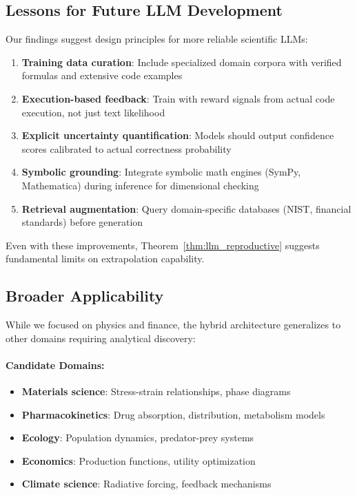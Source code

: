 \documentclass[twoside,11pt]{article}
\begin{document}
\subsection{Lessons for Future LLM Development}

Our findings suggest design principles for more reliable scientific LLMs:

\begin{enumerate}
\item \textbf{Training data curation}: Include specialized domain corpora with verified formulas and extensive code examples

\item \textbf{Execution-based feedback}: Train with reward signals from actual code execution, not just text likelihood

\item \textbf{Explicit uncertainty quantification}: Models should output confidence scores calibrated to actual correctness probability

\item \textbf{Symbolic grounding}: Integrate symbolic math engines (SymPy, Mathematica) during inference for dimensional checking

\item \textbf{Retrieval augmentation}: Query domain-specific databases (NIST, financial standards) before generation
\end{enumerate}

Even with these improvements, Theorem~\ref{thm:llm_reproductive} suggests fundamental limits on extrapolation capability.

\subsection{Broader Applicability}

While we focused on physics and finance, the hybrid architecture generalizes to other domains requiring analytical discovery:

\paragraph{Candidate Domains:}
\begin{itemize}
\item \textbf{Materials science}: Stress-strain relationships, phase diagrams
\item \textbf{Pharmacokinetics}: Drug absorption, distribution, metabolism models
\item \textbf{Ecology}: Population dynamics, predator-prey systems
\item \textbf{Economics}: Production functions, utility optimization
\item \textbf{Climate science}: Radiative forcing, feedback mechanisms
\end{itemize}
\end{document}
